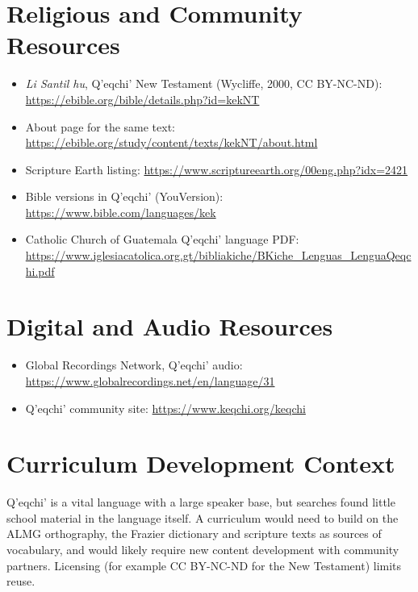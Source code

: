 \documentclass[12pt]{article}
\begin{document}
\section{Religious and Community Resources}
\begin{itemize}
\item \emph{Li Santil hu}, Q'eqchi' New Testament (Wycliffe, 2000, CC BY-NC-ND): \url{https://ebible.org/bible/details.php?id=kekNT}
\item About page for the same text: \url{https://ebible.org/study/content/texts/kekNT/about.html}
\item Scripture Earth listing: \url{https://www.scriptureearth.org/00eng.php?idx=2421}
\item Bible versions in Q'eqchi' (YouVersion): \url{https://www.bible.com/languages/kek}
\item Catholic Church of Guatemala Q'eqchi' language PDF: \url{https://www.iglesiacatolica.org.gt/bibliakiche/BKiche_Lenguas_LenguaQeqchi.pdf}
\end{itemize}

\section{Digital and Audio Resources}
\begin{itemize}
\item Global Recordings Network, Q'eqchi' audio: \url{https://www.globalrecordings.net/en/language/31}
\item Q'eqchi' community site: \url{https://www.keqchi.org/keqchi}
\end{itemize}

\section{Curriculum Development Context}
Q'eqchi' is a vital language with a large speaker base, but searches found little school material in the language itself. A curriculum would need to build on the ALMG orthography, the Frazier dictionary and scripture texts as sources of vocabulary, and would likely require new content development with community partners. Licensing (for example CC BY-NC-ND for the New Testament) limits reuse.
\end{document}
